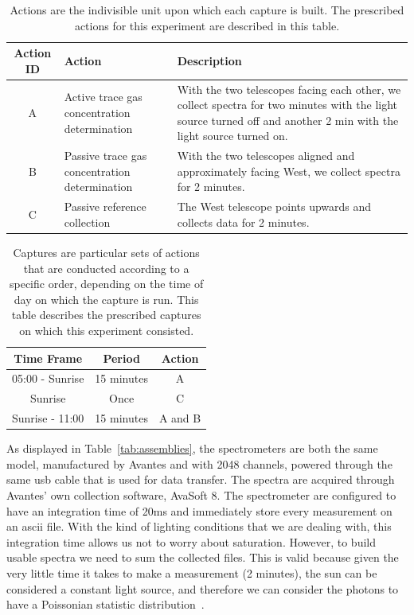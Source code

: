 \begin{table}[htpb]
    \centering
    \small
    \caption{Actions are the indivisible unit upon which each capture is
    built. The prescribed actions for this experiment are described in
    this table.}
    \label{tab:actions}
    \begin{tabularx}{\textwidth}{cXX}
        \toprule
        \textbf{Action ID} & \textbf{Action} & \textbf{Description} \\ \midrule
        A & Active trace gas concentration determination & With the two
        telescopes facing each other, we collect spectra for two minutes
        with the light source turned off and another 2 min with the light
        source turned on. \\
        \midrule
        B & Passive trace gas concentration determination & With the two
        telescopes aligned and approximately facing West, we collect spectra
        for 2 minutes. \\
        \midrule
        C & Passive reference collection & The West telescope points upwards
        and collects data for 2 minutes. \\ \bottomrule
    \end{tabularx}
\end{table}

\begin{table}[htpb]
    \centering
    \caption{Captures are particular sets of actions that are conducted
    according to a specific order, depending on the time of day on which
    the capture is run. This table describes the prescribed captures on
    which this experiment consisted.}
    \label{tab:captures}
    \begin{tabular}{@{}ccc@{}}
        \toprule
        \textbf{Time Frame} & \textbf{Period} & \textbf{Action} \\
        \midrule
        05:00 - Sunrise & 15 minutes & A \\
        Sunrise & Once & C \\
        Sunrise - 11:00 & 15 minutes & A and B\\
        \bottomrule
    \end{tabular}
\end{table}

As displayed in Table~\ref{tab:assemblies}, the spectrometers are both
the same model, manufactured by Avantes and with 2048 channels, powered
through the same \gls{usb} cable that is used for data transfer. The
spectra are acquired through Avantes' own collection software, AvaSoft
8. The spectrometer are configured to have an integration time of 20ms
and immediately store every measurement on an \gls{ascii} file. With the
kind of lighting conditions that we are dealing with, this integration
time allows us not to worry about saturation. However, to build usable
spectra we need to sum the collected files. This is valid because given
the very little time it takes to make a measurement (2 minutes), the sun
can be considered a constant light source, and therefore
we can consider the photons to have a Poissonian statistic
distribution~\cite{Fox2006}.




